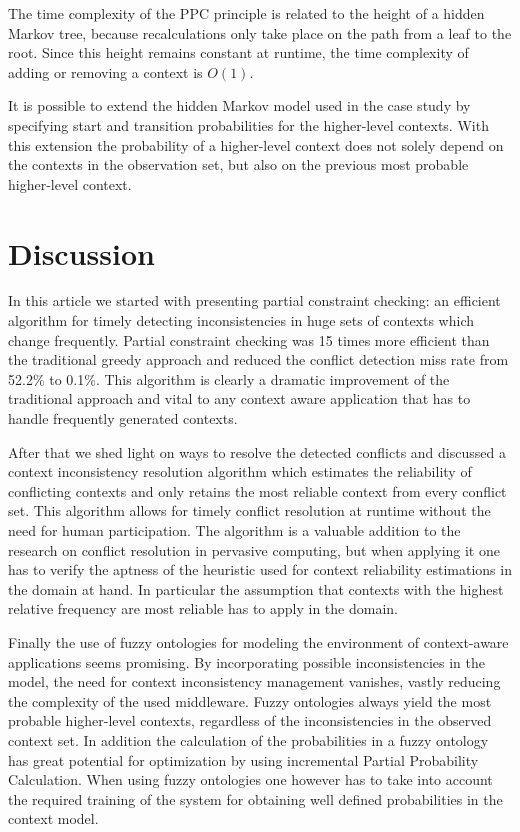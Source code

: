 \documentclass[journal]{vgtc}                %
\begin{document}
The time complexity of the PPC principle is related to the height of a hidden Markov tree, because recalculations only take place on the path from a leaf to the root. Since this height remains constant at runtime, the time complexity of adding or removing a context is $O(1)$.

It is possible to extend the hidden Markov model used in the case study by specifying start and transition probabilities for the higher-level contexts. With this extension the probability of a higher-level context does not solely depend on the contexts in the observation set, but also on the previous most probable higher-level context.

\section{Discussion}
In this article we started with presenting partial constraint checking: an efficient algorithm for timely detecting inconsistencies in huge sets of contexts which change frequently. Partial constraint checking was 15 times more efficient than the traditional greedy approach and reduced the conflict detection miss rate from 52.2\% to 0.1\%. This algorithm is clearly a dramatic improvement of the traditional approach and vital to any context aware application that has to handle frequently generated contexts.

After that we shed light on ways to resolve the detected conflicts and discussed a context inconsistency resolution algorithm which estimates the reliability of conflicting contexts and only retains the most reliable context from every conflict set. This algorithm allows for timely conflict resolution at runtime without the need for human participation. The algorithm is a valuable addition to the research on conflict resolution in pervasive computing, but when applying it one has to verify the aptness of the heuristic used for context reliability estimations in the domain at hand. In particular the assumption that contexts with the highest relative frequency are most reliable has to apply in the domain.

Finally the use of fuzzy ontologies for modeling the environment of context-aware applications seems promising. By incorporating possible inconsistencies in the model, the need for context inconsistency management vanishes, vastly reducing the complexity of the used middleware. Fuzzy ontologies always yield the most probable higher-level contexts, regardless of the inconsistencies in the observed context set. In addition the calculation of the probabilities in a fuzzy ontology has great potential for optimization by using incremental Partial Probability Calculation. 
When using fuzzy ontologies one however has to take into account the required training of the system for obtaining well defined probabilities in the context model. 
\end{document}
